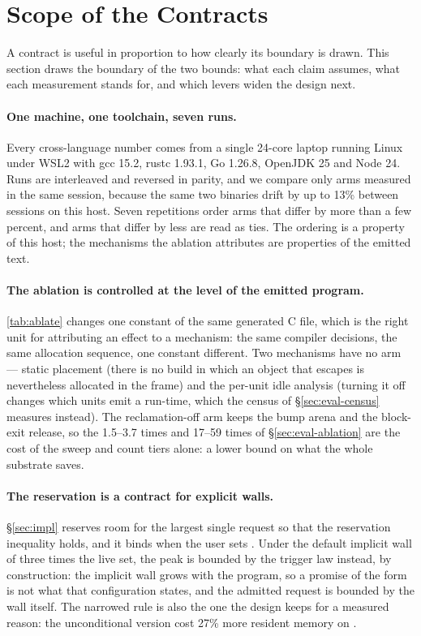 \section{Scope of the Contracts}
\label{sec:limitations}

A contract is useful in proportion to how clearly its boundary is drawn.  This section draws the
boundary of the two bounds: what each claim assumes, what each measurement stands for, and which
levers widen the design next.

\paragraph{One machine, one toolchain, seven runs.}
Every cross-language number comes from a single 24-core laptop running Linux under WSL2 with gcc
15.2, rustc 1.93.1, Go 1.26.8, OpenJDK 25 and Node 24.  Runs are interleaved and reversed in parity,
and we compare only arms measured in the same session, because the same two binaries drift by up to
13\% between sessions on this host.  Seven repetitions order arms that differ by more than a few
percent, and arms that differ by less are read as ties.  The ordering is a property of this host; the
mechanisms the ablation attributes are properties of the emitted text.

\paragraph{The ablation is controlled at the level of the emitted program.}
\tab\ref{tab:ablate} changes one  constant of the same generated C file, which is the right
unit for attributing an effect to a mechanism: the same compiler decisions, the same allocation
sequence, one constant different.  Two mechanisms have no arm --- static placement (there is no build
in which an object that escapes is nevertheless allocated in the frame) and the per-unit idle
analysis (turning it off changes which units emit a run-time, which the census of
\S\ref{sec:eval-census} measures instead).  The reclamation-off arm keeps the bump arena and the
block-exit release, so the 1.5--3.7 times and 17--59 times of \S\ref{sec:eval-ablation} are the cost
of the sweep and count tiers alone: a lower bound on what the whole substrate saves.

\paragraph{The reservation is a contract for explicit walls.}
\S\ref{sec:impl} reserves room for the largest single request so that the reservation inequality
holds, and it binds when the user sets .  Under the default implicit wall of
three times the live set, the peak is bounded by the trigger law instead, by construction: the
implicit wall grows with the program, so a promise of the form  is
not what that configuration states, and the admitted request is bounded by the wall itself.  The
narrowed rule is also the one the design keeps for a measured reason: the unconditional version cost
27\% more resident memory on .

